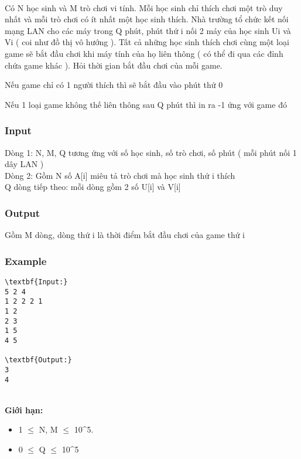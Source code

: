 

 

Có N học sinh và M trò chơi vi tính. Mỗi học sinh chỉ thích chơi một trò duy nhất và mỗi trò chơi có ít nhất một học sinh thích. Nhà trường tổ chức kết nối mạng LAN cho các máy trong Q phút, phút thứ i nối 2 máy của học sinh Ui và Vi ( coi như đồ thị vô hướng ). Tất cả những học sinh thích chơi cùng một loại game sẽ bắt đầu chơi khi máy tính của họ liên thông ( có thể đi qua các đỉnh chứa game khác ). Hỏi thời gian bắt đầu chơi của mỗi game.

Nếu game chỉ có 1 người thích thì sẽ bắt đầu vào phút thứ 0

Nếu 1 loại game không thế liên thông sau Q phút thì in ra -1 ứng với game đó

\subsubsection{Input}

Dòng 1: N, M, Q tương ứng với số học sinh, số trò chơi, số phút ( mỗi phút nối 1 dây LAN )
\\Dòng 2: Gồm N số A[i] miêu tả trò chơi mà học sinh thứ i thích
\\Q dòng tiếp theo: mỗi dòng gồm 2 số U[i] và V[i]

\subsubsection{Output}

Gồm M dòng, dòng thứ i là thời điểm bắt đầu chơi của game thứ i

\subsubsection{Example}
\begin{verbatim}
\textbf{Input:}
5 2 4
1 2 2 2 1
1 2
2 3
1 5
4 5

\textbf{Output:}
3
4\end{verbatim}
\\\textbf{Giới hạn:} 
\begin{itemize}
	\item 1  $\le$  N, M  $\le$  10^5.
	\item 0  $\le$  Q  $\le$  10^5
\end{itemize}
